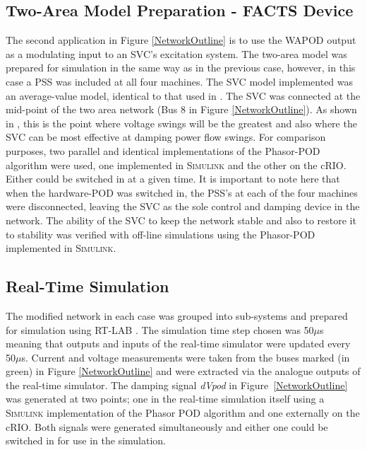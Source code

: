 \documentclass{ieeeaccess}
\begin{document}
\subsection{Two-Area Model Preparation - FACTS Device}

The second application in Figure \ref{NetworkOutline} is to use the WAPOD output as a modulating input to an SVC's excitation system. The two-area model was prepared for simulation in the same way as in the previous case, however, in this case a PSS was included at all four machines. The SVC model implemented was an average-value model, identical to that used in \cite{PhasorPODImplement}. The SVC was connected at the mid-point of the two area network (Bus 8 in Figure \ref{NetworkOutline}). As shown in \cite{sVARdamp}, this is the point where voltage swings will be the greatest and also where the SVC can be most effective at damping power flow swings. For comparison purposes, two parallel and identical implementations of the Phasor-POD algorithm were used, one implemented in \textsc{Simulink} and the other on the cRIO. Either could be switched in at a given time. It is important to note here that when the hardware-POD was switched in, the PSS's at each of the four machines were disconnected, leaving the SVC as the sole control and damping device in the network. The ability of the SVC to keep the network stable and also to restore it to stability was verified with off-line simulations using the Phasor-POD implemented in \textsc{Simulink}.

\subsection{Real-Time Simulation}
The modified network in each case was grouped into sub-systems and prepared for simulation using RT-LAB \cite{eMEGASIM}. The simulation time step chosen was 50$\mu$s meaning that outputs and inputs of the real-time simulator were updated every 50$\mu$s. Current and voltage measurements were taken from the buses marked (in green) in Figure \ref{NetworkOutline} and were extracted via the analogue outputs of the real-time simulator. The damping signal \emph{dVpod} in Figure~\ref{NetworkOutline} was generated at two points; one in the real-time simulation itself using a \textsc{Simulink} implementation of the Phasor POD algorithm and one externally on the cRIO. Both signals were generated simultaneously and either one could be switched in for use in the simulation.
\end{document}
